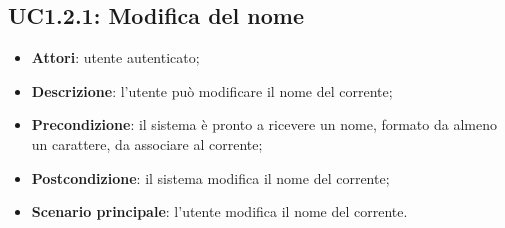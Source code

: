 \subsection{UC1.2.1: Modifica del nome}
\label{UC1.2.1}
\begin{itemize}
\item \textbf{Attori}: utente autenticato;
\item \textbf{Descrizione}: l'utente può modificare il nome del  corrente;
\item \textbf{Precondizione}: il sistema è pronto a ricevere un nome, formato da almeno un carattere, da associare al  corrente;
\item \textbf{Postcondizione}: il sistema modifica il nome del  corrente;
\item \textbf{Scenario principale}:
l'utente modifica il nome del  corrente.
\end{itemize}
